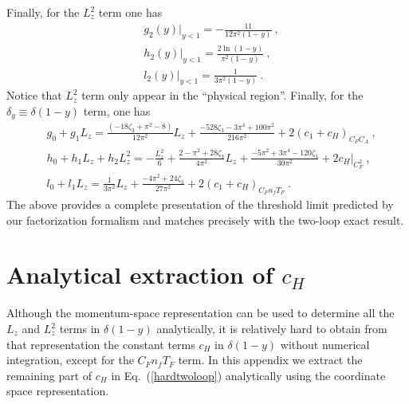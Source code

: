 \documentclass[a4paper,11pt]{article}
\begin{document}
Finally, for the $L_z^2$ term one has
\begin{align}
&g_{2}(y)|_{y<1}=-\frac{11}{12\pi^2(1-y)} \ , \\ 
&h_{2}(y)|_{y<1}=\frac{2\ln(1-y)}{\pi^2(1-y)} \ , \\
&l_{2}(y)|_{y<1}=\frac{1}{3\pi^2(1-y)} \ .
\end{align}
Notice that $L_z^2$ term only appear in the ``physical region''. Finally, for the $\delta_y \equiv \delta(1-y)$ term, one has
\begin{align}
&g_0+g_1L_z=\frac{\left(-18 \zeta_3+\pi ^2-8\right)}{12 \pi ^2}L_z+\frac{-528 \zeta_3 -3\pi ^4+100 \pi ^2}{216 \pi ^2}+2(c_1+c_H)_{C_FC_A} \ , \\
&h_0+h_1L_z+h_2L_z^2=-\frac{L_z^2}{6}+\frac{2-\pi^2+28\zeta_3}{4\pi^2}L_z+\frac{-5\pi^2+3\pi^4-120\zeta_3}{30\pi^2}+2c_H|_{C_F^2}  \ , \\ 
&l_0+l_1L_z=\frac{1}{3\pi^2}L_z+\frac{-4\pi^2+24\zeta_3}{27\pi^2} +2(c_1+c_H)_{C_Fn_fT_F}\ .
\end{align}
The above provides a complete presentation of the threshold limit predicted by our factorization formalism and matches precisely with the two-loop exact result. 









\section{Analytical extraction of $c_H$}\label{sec:cHanaly}
Although the momentum-space representation can be used to determine all the $L_z$ and $L_z^2$ terms in $\delta(1-y)$ analytically, it is relatively hard to obtain from that representation the constant terms $c_H$ in $\delta(1-y)$ without numerical integration, except for the $C_Fn_fT_F$ term. In this appendix we extract the remaining part of $c_H$ in Eq.~(\ref{hardtwoloop}) analytically using the coordinate space representation. 
\end{document}
